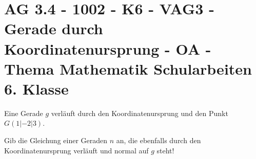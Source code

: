 \section{AG 3.4 - 1002 - K6 - VAG3 - Gerade durch Koordinatenursprung - OA - Thema Mathematik Schularbeiten 6. Klasse}

\begin{beispiel}[K6 - VAG3]{1} %
			Eine Gerade $g$ verläuft durch den Koordinatenursprung und den Punkt \mbox{$G(1|-2|3)$}.
			
			Gib die Gleichung einer Geraden $n$ an, die ebenfalls durch den Koordinatenursprung verläuft und normal auf $g$ steht!
			
			\end{beispiel}